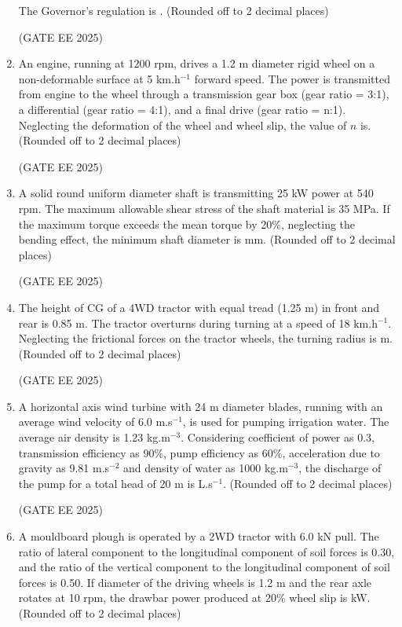 \documentclass[journal,12pt,onecolumn]{IEEEtran}
\theoremstyle{remark}
\begin{document}
\begin{enumerate}
The Governor's regulation is \underline{\hspace{2cm}}. (Rounded off to 2 decimal places)

\hfill(GATE EE 2025)

\item An engine, running at 1200 rpm, drives a 1.2 m diameter rigid wheel on a non-deformable surface at 5 km.h$^{-1}$ forward speed. The power is transmitted from engine to the wheel through a transmission gear box (gear ratio = 3:1), a differential (gear ratio = 4:1), and a final drive (gear ratio = n:1). Neglecting the deformation of the wheel and wheel slip, the value of $n$ is\underline{\hspace{2cm}}. (Rounded off to 2 decimal places)

\hfill(GATE EE 2025)

\item A solid round uniform diameter shaft is transmitting 25 kW power at 540 rpm. The maximum allowable shear stress of the shaft material is 35 MPa. If the maximum torque exceeds the mean torque by 20\%, neglecting the bending effect, the minimum shaft diameter is \underline{\hspace{2cm}} mm. (Rounded off to 2 decimal places)

\hfill(GATE EE 2025)

\item The height of CG of a 4WD tractor with equal tread (1.25 m) in front and rear is 0.85 m. The tractor overturns during turning at a speed of 18 km.h$^{-1}$. Neglecting the frictional forces on the tractor wheels, the turning radius is \underline{\hspace{2cm}} m. (Rounded off to 2 decimal places)

\hfill(GATE EE 2025)

\item A horizontal axis wind turbine with 24 m diameter blades, running with an average wind velocity of 6.0 m.s$^{-1}$, is used for pumping irrigation water. The average air density is 1.23 kg.m$^{-3}$. Considering coefficient of power as 0.3, transmission efficiency as 90\%, pump efficiency as 60\%, acceleration due to gravity as 9.81 m.s$^{-2}$ and density of water as 1000 kg.m$^{-3}$, the discharge of the pump for a total head of 20 m is \underline{\hspace{2cm}} L.s$^{-1}$. (Rounded off to 2 decimal places)

\hfill(GATE EE 2025)

\item A mouldboard plough is operated by a 2WD tractor with 6.0 kN pull. The ratio of lateral component to the longitudinal component of soil forces is 0.30, and the ratio of the vertical component to the longitudinal component of soil forces is 0.50. If diameter of the driving wheels is 1.2 m and the rear axle rotates at 10 rpm, the drawbar power produced at 20\% wheel slip is\underline{\hspace{2cm}} kW. (Rounded off to 2 decimal places)


\end{enumerate}
\end{document}
